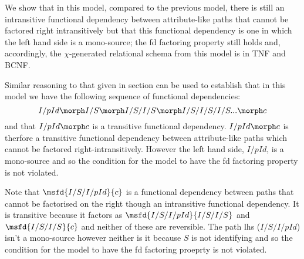 We show that in this model, compared to the previous model,  there is still
 an intransitive functional dependency between attribute-like paths that cannot be factored right intransitively but that this functional dependency is one in which the left hand side 
is a mono-source; the fd factoring property still holds and,
accordingly, the $\chi$-generated relational schema from this model is in TNF and BCNF.


Similar reasoning to that given in section  can be used to establish that 
in this model we have the following sequence of functional dependencies:
\begin{equation}
I/pId \morph I/S \morph I/S/I/S \morph I/S/I/S/I/S ... \morph c
\end{equation}
and that $I/pId \morph c$ is a transitive functional dependency.  $I/pId \morph c$ is therfore a transitive functional dependency between attribute-like paths which cannot
be factored right-intransitively. However  the left hand side, $I/pId$, is a mono-source and so the condition for the model to have the fd factoring property is not violated.

Note that $\msfd{I/S/I/pId}{c}$ is a functional dependency between  paths that cannot be factorised on the right though an intransitive functional dependency. 
 It is transitive because it factors as $\msfd{I/S/I/pId}{I/S/I/S}$ and $\msfd{I/S/I/S}{c}$ and neither of these are reversible. The path lhs ($I/S/I/pId$) isn't a mono-source 
however neither is it  because $S$ is not identifying and so the condition for the model to have the fd factoring proeprty is not violated.

